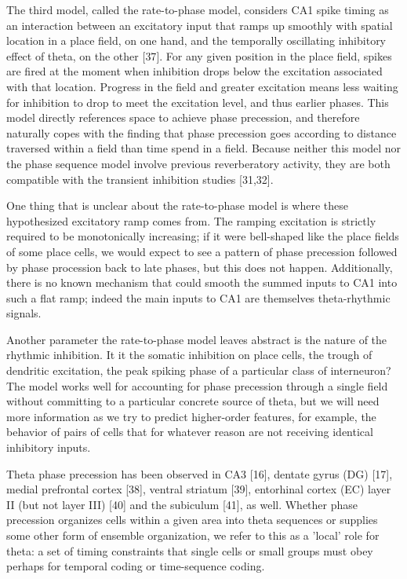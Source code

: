 \documentclass[]{article}
\begin{document}
The third model, called the rate-to-phase model, considers CA1 spike
timing as an interaction between an excitatory input that ramps up
smoothly with spatial location in a place field, on one hand, and the
temporally oscillating inhibitory effect of theta, on the other
{[}37{]}. For any given position in the place field, spikes are fired at
the moment when inhibition drops below the excitation associated with
that location. Progress in the field and greater excitation means less
waiting for inhibition to drop to meet the excitation level, and thus
earlier phases. This model directly references space to achieve phase
precession, and therefore naturally copes with the finding that phase
precession goes according to distance traversed within a field than time
spend in a field. Because neither this model nor the phase sequence
model involve previous reverberatory activity, they are both compatible
with the transient inhibition studies {[}31,32{]}.

One thing that is unclear about the rate-to-phase model is where these
hypothesized excitatory ramp comes from. The ramping excitation is
strictly required to be monotonically increasing; if it were bell-shaped
like the place fields of some place cells, we would expect to see a
pattern of phase precession followed by phase procession back to late
phases, but this does not happen. Additionally, there is no known
mechanism that could smooth the summed inputs to CA1 into such a flat
ramp; indeed the main inputs to CA1 are themselves theta-rhythmic
signals.

Another parameter the rate-to-phase model leaves abstract is the nature
of the rhythmic inhibition. It it the somatic inhibition on place cells,
the trough of dendritic excitation, the peak spiking phase of a
particular class of interneuron? The model works well for accounting for
phase precession through a single field without committing to a
particular concrete source of theta, but we will need more information
as we try to predict higher-order features, for example, the behavior of
pairs of cells that for whatever reason are not receiving identical
inhibitory inputs.

Theta phase precession has been observed in CA3 {[}16{]}, dentate gyrus
(DG) {[}17{]}, medial prefrontal cortex {[}38{]}, ventral striatum
{[}39{]}, entorhinal cortex (EC) layer II (but not layer III) {[}40{]}
and the subiculum {[}41{]}, as well. Whether phase precession organizes
cells within a given area into theta sequences or supplies some other
form of ensemble organization, we refer to this as a 'local' role for
theta: a set of timing constraints that single cells or small groups
must obey perhaps for temporal coding or time-sequence coding.
\end{document}
